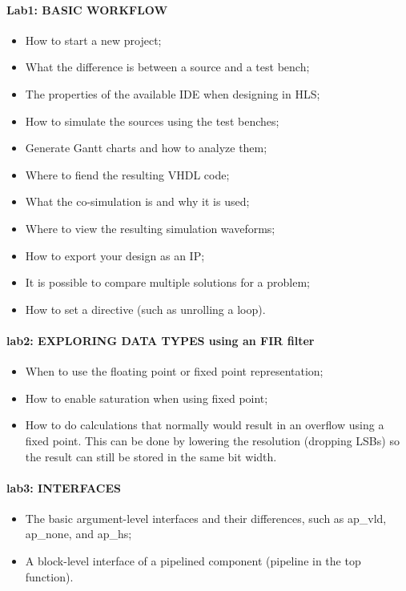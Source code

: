 \paragraph{Lab1: BASIC WORKFLOW} 
\begin{itemize}
	\item How to start a new project;
	\item What the difference is between a source and a test bench;
	\item The properties of the available IDE when designing in HLS;
	\item How to simulate the sources using the test benches;
	\item Generate Gantt charts and how to analyze them;
	\item Where to fiend the resulting VHDL code;
	\item What the co-simulation is and why it is used;
	\item Where to view the resulting simulation waveforms;
	\item How to export your design as an IP;
	\item It is possible to compare multiple solutions for a problem;
	\item How to set a directive (such as unrolling a loop).
\end{itemize}

\paragraph{lab2: EXPLORING DATA TYPES using an FIR filter}
\begin{itemize}
	\item When to use the floating point or fixed point representation;
	\item How to enable saturation when using fixed point;
	\item How to do calculations that normally would result in an overflow using a fixed point. This can be done by lowering the resolution (dropping LSBs) so the result can still be stored in the same bit width.
\end{itemize}

\paragraph{lab3: INTERFACES} 
\begin{itemize}
	\item The basic argument-level interfaces and their differences, such as ap\_vld, ap\_none, and ap\_hs;
	\item A block-level interface of a pipelined component (pipeline in the top function).
\end{itemize}


